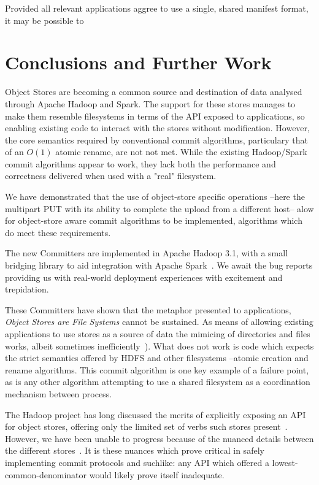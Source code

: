 \documentclass[conference]{IEEEtran}
\begin{document}
Provided all relevant applications aggree to use a single, shared manifest
format, it may be possible to

\section{Conclusions and Further Work}
\label{sec:conclusions}

Object Stores are becoming a common source and destination of data analysed
through Apache Hadoop and Spark.
The support for these stores manages to make them resemble filesystems in
terms of the API exposed to applications, so enabling existing code to
interact with the stores without modification.
However, the core semantics required by conventional commit algorithms, particulary
that of an $O(1)$ atomic rename, are not not met.
While the existing Hadoop/Spark commit algorithms appear to work, they lack
both the performance and correctness delivered when used with a "real" filesystem.

We have demonstrated that the use of object-store specific operations --here
the multipart PUT with its ability to complete the upload from a different host--
alow for object-store aware commit algorithms to be implemented,
algorithms which do meet these requirements.

The new Committers are implemented in Apache Hadoop 3.1, with a small bridging
library to aid integration with Apache Spark\ \cite{HADOOP-13786}.
We await the bug reports providing us with real-world deployment experiences
with excitement and trepidation.


These Committers have shown that the metaphor presented to applications,
\emph{Object Stores are File Systems} cannot be sustained.
As means of allowing existing applications to use stores as a source
of data the mimicing of directories and files works, albeit sometimes
inefficiently\ \cite{HADOOP-13208}).
What does not work is code which expects the strict semantics
offered by HDFS and other filesystems --atomic creation and rename algorithms.
This commit algorithm is one key example of a failure point, as
is any other algorithm attempting to use a shared filesystem
as a coordination mechanism between process.

The Hadoop project has long discussed the merits of explicitly
exposing an API for object stores, offering only the limited
set of verbs such stores present\ \cite{HADOOP-9565}.
However, we have been unable to progress because of the nuanced details
between the different stores\ \cite{S3, WASB, ADL, GCS}.
It is these nuances which prove critical in safely implementing
commit protocols and suchlike: any API which offered a lowest-common-denominator
would likely prove itself inadequate.
\end{document}
